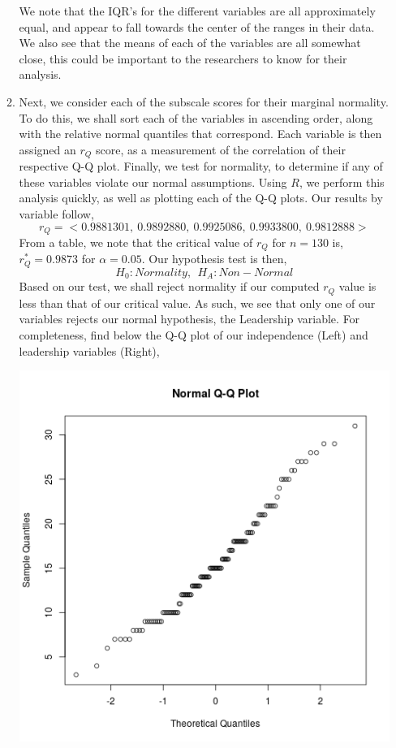 \documentclass[letterpaper,10pt]{article}
\begin{document}
\begin{enumerate}
\begin{enumerate}
\begin{center}
\end{center}
We note that the IQR's for the different variables are all approximately equal, and appear to fall towards the center of the ranges in their data. We also see that the means of each of the variables are all somewhat close, this could be important to the researchers to know for their analysis.
\item Next, we consider each of the subscale scores for their marginal normality. To do this, we shall sort each of the variables in ascending order, along with the relative normal quantiles that correspond. Each variable is then assigned an $r_Q$ score, as a measurement of the correlation of their respective Q-Q plot. Finally, we test for normality, to determine if any of these variables violate our normal assumptions. Using $R$, we perform this analysis quickly, as well as plotting each of the Q-Q plots. Our results by variable follow,
\[r_Q=<0.9881301,\ 0.9892880,\ 0.9925086,\ 0.9933800,\ 0.9812888>\]
From a table, we note that the critical value of $r_Q$ for $n=130$ is, $r_Q^*=0.9873$ for $\alpha=0.05$. Our hypothesis test is then,
\[H_0: Normality,\ \ H_A: Non-Normal\]
Based on our test, we shall reject normality if our computed $r_Q$ value is less than that of our critical value. As such, we see that only one of our variables rejects our normal hypothesis, the Leadership variable. For completeness, find below the Q-Q plot of our independence (Left) and leadership variables (Right),
\begin{center}
\includegraphics[scale=.5]{indepqq.png}

\end{center}
\end{enumerate}
\end{enumerate}
\end{document}
